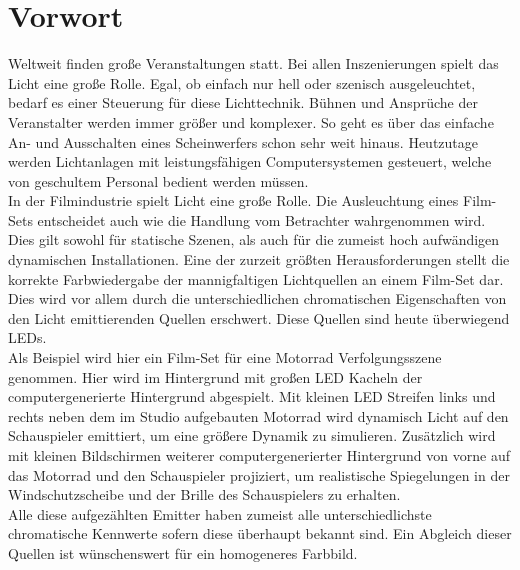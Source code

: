 \documentclass[11pt]{scrartcl}
\begin{document}
\section*{Vorwort}
Weltweit finden große Veranstaltungen statt. Bei allen Inszenierungen spielt das Licht eine 
große Rolle. Egal, ob einfach nur hell oder szenisch ausgeleuchtet, bedarf es einer Steuerung 
für diese Lichttechnik. Bühnen und Ansprüche der Veranstalter werden immer größer und komplexer. 
So geht es über das einfache An- und Ausschalten eines Scheinwerfers schon sehr weit hinaus. 
Heutzutage werden Lichtanlagen mit leistungsfähigen Computersystemen gesteuert, welche von 
geschultem Personal bedient werden müssen.\\
In der Filmindustrie spielt Licht eine große Rolle. Die Ausleuchtung eines Film-Sets entscheidet 
auch wie die Handlung vom Betrachter wahrgenommen wird. Dies gilt sowohl für statische Szenen, 
als auch für die zumeist hoch aufwändigen dynamischen Installationen.
Eine der zurzeit größten Herausforderungen stellt die korrekte Farbwiedergabe der mannigfaltigen 
Lichtquellen an einem Film-Set dar.
Dies wird vor allem durch die unterschiedlichen chromatischen Eigenschaften von den Licht 
emittierenden Quellen erschwert. Diese Quellen sind heute überwiegend LEDs.\\
Als Beispiel wird hier ein Film-Set für eine Motorrad Verfolgungsszene genommen. Hier wird im 
Hintergrund mit großen LED Kacheln der computergenerierte Hintergrund abgespielt. Mit kleinen 
LED Streifen links und rechts neben dem im Studio aufgebauten Motorrad wird dynamisch Licht auf 
den Schauspieler emittiert, um eine größere Dynamik zu simulieren.
Zusätzlich wird mit kleinen Bildschirmen weiterer computergenerierter Hintergrund von vorne auf 
das Motorrad und den Schauspieler projiziert, um realistische Spiegelungen in der 
Windschutzscheibe und der Brille des Schauspielers zu erhalten.\\
Alle diese aufgezählten Emitter haben zumeist alle unterschiedlichste chromatische Kennwerte 
sofern diese überhaupt bekannt sind. Ein Abgleich dieser Quellen ist wünschenswert für ein 
homogeneres Farbbild.
\clearpage

\end{document}
